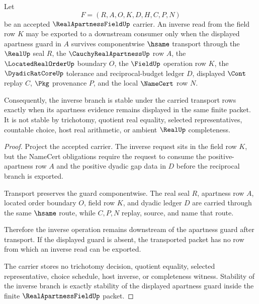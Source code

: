 \begin{theorem}\label{thm:real-apartness-field-inverse-guard-stability}
Let
$$
F=(R,A,O,K,D,H,C,P,N)
$$
be an accepted $\RealApartnessFieldUp$ carrier. An inverse read from the field row $K$ may be exported to a downstream consumer only when the displayed apartness guard in $A$ survives componentwise $\hsame$ transport through the $\RealUp$ seal $R$, the $\CauchyRealApartnessUp$ row $A$, the $\LocatedRealOrderUp$ boundary $O$, the $\FieldUp$ operation row $K$, the $\DyadicRatCoreUp$ tolerance and reciprocal-budget ledger $D$, displayed $\Cont$ replay $C$, $\Pkg$ provenance $P$, and the local $\NameCert$ row $N$.

Consequently, the inverse branch is stable under the carried transport rows exactly when its apartness evidence remains displayed in the same finite packet. It is not stable by trichotomy, quotient real equality, selected representatives, countable choice, host real arithmetic, or ambient $\RealUp$ completeness.
\end{theorem}
\begin{proof}
Project the accepted carrier. The inverse request sits in the field row $K$, but the NameCert obligations require the request to consume the positive-apartness row $A$ and the positive dyadic gap data in $D$ before the reciprocal branch is exported.

Transport preserves the guard componentwise. The real seal $R$, apartness row $A$, located order boundary $O$, field row $K$, and dyadic ledger $D$ are carried through the same $\hsame$ route, while $C,P,N$ replay, source, and name that route.

Therefore the inverse operation remains downstream of the apartness guard after transport. If the displayed guard is absent, the transported packet has no row from which an inverse read can be exported.

The carrier stores no trichotomy decision, quotient equality, selected representative, choice schedule, host inverse, or completeness witness. Stability of the inverse branch is exactly stability of the displayed apartness guard inside the finite $\RealApartnessFieldUp$ packet.
\end{proof}

